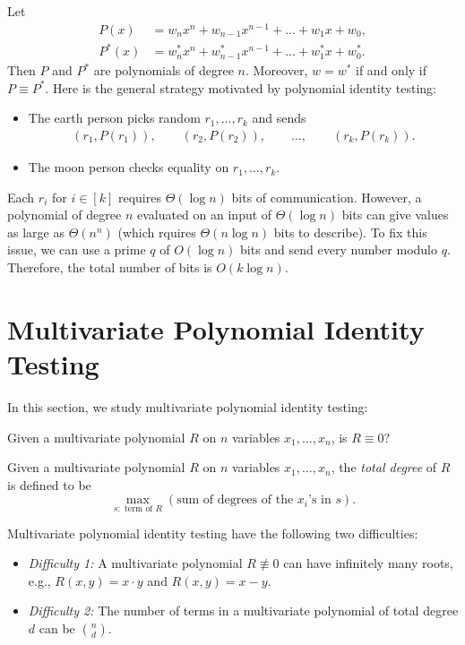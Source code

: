 \documentclass[letterpaper, reqno,11pt]{article}
\begin{document}
Let
\begin{align*}
  P(x) &= w_n x^n + w_{n - 1} x^{n - 1} + \ldots + w_1 x + w_0, \\
  P^*(x) &= w_n^* x^n + w_{n - 1}^* x^{n - 1} + \ldots + w_1^* x + w_0^*.
\end{align*}
Then $P$ and $P^*$ are polynomials of degree $n$. Moreover, $w = w^*$ if and only if $P \equiv P^*$. Here is the general strategy motivated by polynomial identity testing:
\begin{itemize}[itemsep=0pt]
  \item The earth person picks random $r_1, \ldots, r_k$ and sends
  \begin{gather*}
    \left(r_1, P\left(r_1\right)\right), \qquad \left(r_2, P\left(r_2\right)\right), \qquad \ldots, \qquad \left(r_k, P\left(r_k\right)\right).
  \end{gather*}
  \item The moon person checks equality on $r_1, \ldots, r_k$.
\end{itemize}
Each $r_i$ for $i \in [k]$ requires $\Theta(\log n)$ bits of communication. However, a polynomial of degree $n$ evaluated on an input of $\Theta(\log n)$ bits can give values as large as $\Theta(n^n)$ (which rquires $\Theta(n \log n)$ bits to describe). To fix this issue, we can use a prime $q$ of $O(\log n)$ bits and send every number modulo $q$. Therefore, the total number of bits is $O(k \log n)$.

\section{Multivariate Polynomial Identity Testing}

In this section, we study multivariate polynomial identity testing:

\begin{problem}
  Given a multivariate polynomial $R$ on $n$ variables $x_1, \ldots, x_n$, is $R \equiv 0$?
\end{problem}

\begin{definition}
  Given a multivariate polynomial $R$ on $n$ variables $x_1, \ldots, x_n$, the \emph{total degree} of $R$ is defined to be
  $$ \max_{s: \text{ term of $R$}} (\text{sum of degrees of the $x_i$'s in $s$}). $$
\end{definition}

Multivariate polynomial identity testing have the following two difficulties:
\begin{itemize}[itemsep=0pt]
  \item \emph{Difficulty 1:} A multivariate polynomial $R \not\equiv 0$ can have infinitely many roots, e.g., $R(x, y) = x \cdot y$ and $R(x, y) = x - y$.
  \item \emph{Difficulty 2:} The number of terms in a multivariate polynomial of total degree $d$ can be $\binom{n}{d}$.
\end{itemize}
\end{document}
